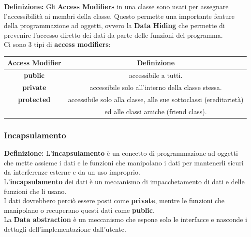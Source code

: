 \textsf{\small \textbf{Definizione: } Gli \textbf{Access Modifiers} in una classe sono usati per assegnare l'accessibilità ai membri della classe. Questo permette una importante feature della programmazione ad oggetti, ovvero la \textbf{Data Hiding} che permette di prevenire l'accesso diretto dei dati da parte delle funzioni del programma.} \\

\textsf{\small Ci sono 3 tipi di \textbf{access modifiers}:} \break

\begin{tabular}{|c|c|}
	\hline
	\textbf{Access Modifier} & \textbf{Definizione} \\
	\hline
	\textsf{\small \textbf{public}} & \textsf{\small accessibile a tutti.} \\
	\hline
	\textsf{\small \textbf{private}} & \textsf{\small accessibile solo all'interno della classe stessa.} \\
	\hline
	\textsf{\small \textbf{protected}} & \textsf{\small accessibile solo alla classe, alle sue sottoclassi (ereditarietà)} \\
	\textsf{\small } & \textsf{\small ed alle classi amiche (friend class).} \\
	\hline
\end{tabular}

\subsubsection{Incapsulamento}

\textsf{\small \textbf{Definizione: } L'\textbf{incapsulamento} è un concetto di programmazione ad oggetti che mette assieme i dati e le funzioni che manipolano i dati per mantenerli sicuri da interferenze esterne e da un uso improprio.} \\

\textsf{\small L'\textbf{incapsulamento} dei dati è un meccanismo di impacchetamento di dati e delle funzioni che li usano. } \\

\textsf{\small I dati dovrebbero perciò essere posti come \textbf{private}, mentre le funzioni che manipolano o recuperano questi dati come \textbf{public}.} \\

\textsf{\small La \textbf{Data abstraction} è un meccanismo che espone solo le interfacce e nasconde  i dettagli dell'implementazione dall'utente.} \break


